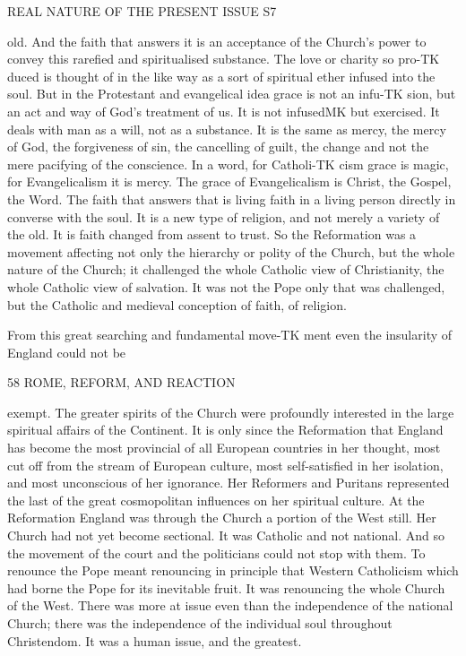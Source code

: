 \documentclass[12pt,a5paper,oneside]{book}
\begin{document}
REAL NATURE OF THE PRESENT ISSUE S7 

old. And the faith that answers it is an acceptance 
of the Church's power to convey this rarefied and 
spiritualised substance. The love or charity so pro-TK
duced is thought of in the like way as a sort of 
spiritual ether infused into the soul. But in the 
Protestant and evangelical idea grace is not an infu-TK
sion, but an act and way of God's treatment of us. 
It is not infusedMK but exercised. It deals with man 
as a will, not as a substance. It is the same as 
mercy, the mercy of God, the forgiveness of sin, 
the cancelling of guilt, the change and not the mere 
pacifying of the conscience. In a word, for Catholi-TK
cism grace is magic, for Evangelicalism it is mercy. 
The grace of Evangelicalism is Christ, the Gospel, 
the Word. The faith that answers that is living 
faith in a living person directly in converse with 
the soul. It is a new type of religion, and not 
merely a variety of the old. It is faith changed 
from assent to trust. So the Reformation was a 
movement affecting not only the hierarchy or polity 
of the Church, but the whole nature of the Church; 
it challenged the whole Catholic view of Christianity, 
the whole Catholic view of salvation. It was not the 
Pope only that was challenged, but the Catholic and 
medieval conception of faith, of religion. 

From this great searching and fundamental move-TK
ment even the insularity of England could not be 



58 ROME, REFORM, AND REACTION 

exempt. The greater spirits of the Church were 
profoundly interested in the large spiritual affairs of 
the Continent. It is only since the Reformation 
that England has become the most provincial of all 
European countries in her thought, most cut off from 
the stream of European culture, most self-satisfied in 
her isolation, and most unconscious of her ignorance. 
Her Reformers and Puritans represented the last of 
the great cosmopolitan influences on her spiritual 
culture. At the Reformation England was through 
the Church a portion of the West still. Her Church 
had not yet become sectional. It was Catholic and 
not national. And so the movement of the court 
and the politicians could not stop with them. To 
renounce the Pope meant renouncing in principle 
that Western Catholicism which had borne the Pope 
for its inevitable fruit. It was renouncing the whole 
Church of the West. There was more at issue 
even than the independence of the national Church; 
there was the independence of the individual soul 
throughout Christendom. It was a human issue, and 
the greatest. 
\end{document}
